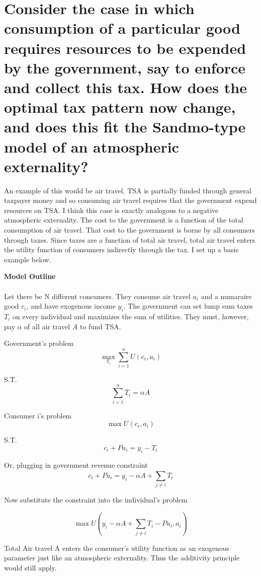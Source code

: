 \documentclass[11pt]{article}
\begin{document}
\section{ Consider the case in which consumption of a particular good requires resources to be expended by the government, say to enforce and collect this tax. How does the optimal tax pattern now change, and does this fit the Sandmo-type model of an atmospheric externality?}

 
An example of this would be air travel. TSA is partially funded through general taxpayer money and so consuming air travel requires that the government expend resources on TSA. I think this case is exactly analogous to a negative atmospheric externality. The cost to the government is a function of the total consumption of air travel. That cost to the government is borne by all consumers through taxes. Since taxes are a function of total air travel, total air travel enters the utility function of consumers indirectly through the tax. I set up a basic example below. \par 

\textbf{Model Outline} \\ \\
Let there be N different consumers. They consume air travel $a_i$ and a numaraire good $c_i$, and have exogenous income $y_i$. The government can set lump sum taxes $T_i$ on every individual and maximizes the sum of utilities. They must, however, pay $\alpha$ of all air travel $A$ to fund TSA. \par 

Government's problem 
$$ \max \limits_{T_i} \sum_{i = 1}^{n} U(c_i, a_i) $$

S.T.
$$  \sum_{i = 1}^{n} T_i = \alpha A$$

Consumer i's problem 
$$ \max U(c_i, a_i) $$ 

S.T.
$$ c_i + Pa_i = y_i - T_i$$

Or, plugging in government revenue constraint
$$ c_i + Pa_i = y_i - \alpha A + \sum_{j \neq i}^{} T_i$$ 

Now substitute the constraint into the individual's problem 

$$ \max U(y_i - \alpha A + \sum_{j \neq i}^{} T_i - Pa_i, a_i) $$ 

Total Air travel A enters the consumer's utility function as an exogenous parameter just like an atmospheric externality. Thus the additivity principle would still apply. 
\end{document}
